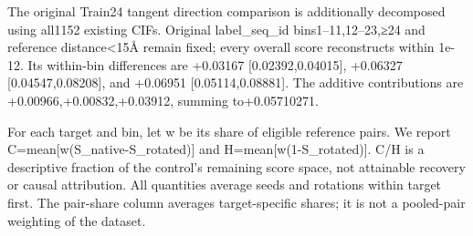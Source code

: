 The original Train24 tangent direction comparison is additionally decomposed
using all1152 existing CIFs. Original label\_seq\_id bins1--11,12--23,≥24 and
reference distance\textless15Å remain fixed; every overall score reconstructs within
1e-12. Its within-bin differences are +0.03167 {[}0.02392,0.04015{]},
+0.06327 {[}0.04547,0.08208{]}, and +0.06951 {[}0.05114,0.08881{]}. The additive
contributions are +0.00966,+0.00832,+0.03912, summing to+0.05710271.

For each target and bin, let w be its share of eligible reference pairs. We
report C=mean{[}w(S\_native-S\_rotated){]} and H=mean{[}w(1-S\_rotated){]}. C/H is a
descriptive fraction of the control's remaining score space, not attainable
recovery or causal attribution. All quantities average seeds and rotations
within target first. The pair-share column averages target-specific shares;
it is not a pooled-pair weighting of the dataset.

